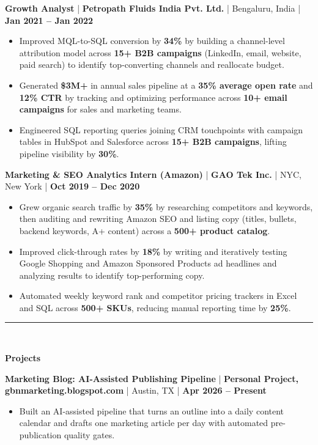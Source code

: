 \documentclass[11pt,letterpaper]{article}
\newcommand{\sectiontitle}[1]{%
  \vspace{3pt}
  \rule{\linewidth}{1.0pt}\\[-12pt]
  \begin{center}
    {\large \textbf{#1}}\\[-5pt]
  \end{center}
  \vspace{-3pt}
}
\newcommand{\job}[4]{%
  \textbf{#1} \;|\; \textbf{#2} \;|\; #3 \;|\; \textbf{#4}\par%
  \vspace{1pt}%
}
\begin{document}
\job{Growth Analyst}
{Petropath Fluids India Pvt. Ltd.}
{Bengaluru, India}
{Jan 2021 -- Jan 2022}
\begin{itemize}
  \item Improved MQL-to-SQL conversion by \textbf{34\%} by building a channel-level attribution model across \textbf{15+ B2B campaigns} (LinkedIn, email, website, paid search) to identify top-converting channels and reallocate budget.
  \item Generated \textbf{\$3M+} in annual sales pipeline at a \textbf{35\% average open rate} and \textbf{12\% CTR} by tracking and optimizing performance across \textbf{10+ email campaigns} for sales and marketing teams.
  \item Engineered SQL reporting queries joining CRM touchpoints with campaign tables in HubSpot and Salesforce across \textbf{15+ B2B campaigns}, lifting pipeline visibility by \textbf{30\%}.
\end{itemize}

\job{Marketing \& SEO Analytics Intern (Amazon)}
{GAO Tek Inc.}
{NYC, New York}
{Oct 2019 -- Dec 2020}
\begin{itemize}
  \item Grew organic search traffic by \textbf{35\%} by researching competitors and keywords, then auditing and rewriting Amazon SEO and listing copy (titles, bullets, backend keywords, A+ content) across a \textbf{500+ product catalog}.
  \item Improved click-through rates by \textbf{18\%} by writing and iteratively testing Google Shopping and Amazon Sponsored Products ad headlines and analyzing results to identify top-performing copy.
  \item Automated weekly keyword rank and competitor pricing trackers in Excel and SQL across \textbf{500+ SKUs}, reducing manual reporting time by \textbf{25\%}.
\end{itemize}

\sectiontitle{Projects}

\job{Marketing Blog: AI-Assisted Publishing Pipeline}
{Personal Project, gbnmarketing.blogspot.com}
{Austin, TX}
{Apr 2026 -- Present}
\begin{itemize}
  \item Built an AI-assisted pipeline that turns an outline into a daily content calendar and drafts one marketing article per day with automated pre-publication quality gates.
\end{itemize}
\end{document}
